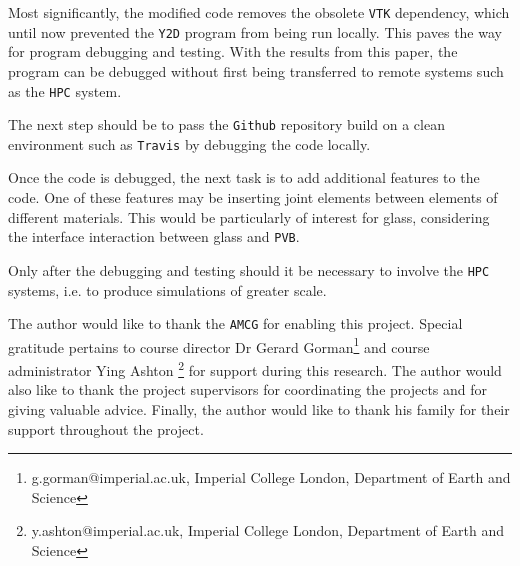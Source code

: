 \bigbreak
Most significantly, the modified code removes the obsolete \texttt{VTK} dependency, which until now prevented the \texttt{Y2D} program from being run locally. This paves the way for program debugging and testing. With the results from this paper, the program can be debugged without first being transferred to remote systems such as the \texttt{HPC} system. 

\bigbreak
 The next step should be to pass the \texttt{Github} repository build on a clean environment such as \texttt{Travis} by debugging the code locally. 

\bigbreak
Once the code is debugged, the next task is to add additional features to the code. One of these features may be inserting joint elements between elements of different materials. This would be particularly of interest for glass, considering the interface interaction between glass and \texttt{PVB}.

\bigbreak
Only after the debugging and testing should it be necessary to involve the \texttt{HPC} systems, i.e. to produce simulations of greater scale.

\begin{acks}
The author would like to thank the \texttt{AMCG} for enabling this project. Special gratitude pertains to course director Dr Gerard Gorman\footnote{g.gorman@imperial.ac.uk, Imperial College London, Department of Earth and Science} and course administrator Ying Ashton \footnote{y.ashton@imperial.ac.uk, Imperial College London, Department of Earth and Science} for support during this research. The author would also like to thank the project supervisors for coordinating the projects and for giving valuable advice. Finally, the author would like to thank his family for their support throughout the project.
\end{acks}